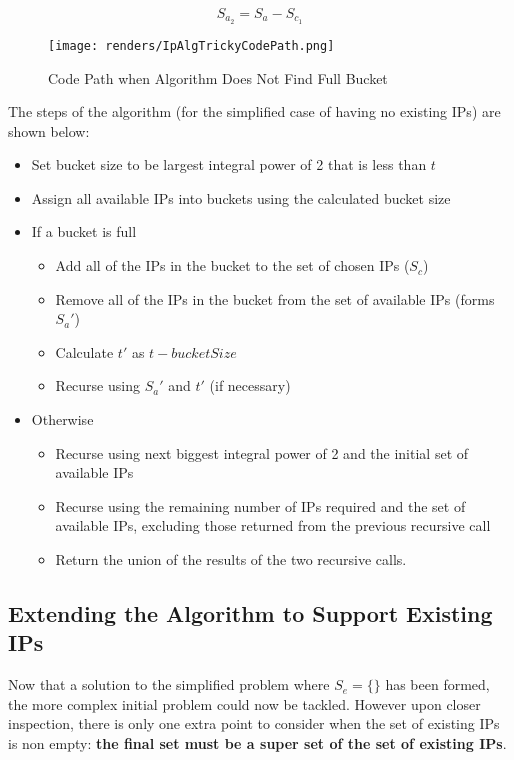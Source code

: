 \begin{equation}\label{eq:availableIpsSecondRecurse}
S_{a_2} = S_a - S_{c_1}
\end{equation}

\begin{figure}[H]
      \centering
      \texttt{[image: renders/IpAlgTrickyCodePath.png]}
      \caption{Code Path when Algorithm Does Not Find Full Bucket}
      \label{fig:ipAlgTrickyCodePath}
\end{figure}

The steps of the algorithm (for the simplified case of having no existing IPs) are shown below:
\begin{itemize}
\item{Set bucket size to be largest integral power of 2 that is less than $t$}
\item{Assign all available IPs into buckets using the calculated bucket size}
\item{If a bucket is full}
  \begin{itemize}
  \item{Add all of the IPs in the bucket to the set of chosen IPs ($S_c$)}
  \item{Remove all of the IPs in the bucket from the set of available IPs (forms $S_a'$)}
  \item{Calculate $t'$ as $t - bucketSize$}
  \item{Recurse using $S_a'$ and $t'$ (if necessary)}
  \end{itemize}
\item{Otherwise}
  \begin{itemize}
  \item{Recurse using next biggest integral power of 2 and the initial set of available IPs}
  \item{Recurse using the remaining number of IPs required and the set of available IPs, excluding those returned from the previous recursive call}
  \item{Return the union of the results of the two recursive calls.}
  \end{itemize}
\end{itemize}

\subsection{Extending the Algorithm to Support Existing IPs}
Now that a solution to the simplified problem where $S_e = \{\}$ has been formed, the more complex initial problem could now be tackled. However upon closer inspection, there is only one extra point to consider when the set of existing IPs is non empty: \textbf{the final set must be a super set of the set of existing IPs}. 

